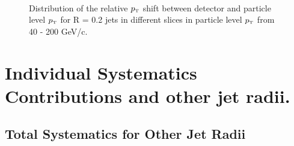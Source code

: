 \documentclass[ALICE]{ALICE_analysis_notes}
\newcommand{\pT}{$p_{\mbox{\tiny T}}$\xspace}
\begin{document}
\begin{appendix}
\begin{figure}[h!]
    \qquad
    \\
    \qquad
    \caption{Distribution of the relative \pT shift between detector and particle level \pT for R = 0.2 jets in different slices in particle level \pT from 40 - 200 GeV/c.}
    \label{fig:EnergyScaleSlices2pPb}
\end{figure}

\newpage

\section{Individual Systematics Contributions and other jet radii.}
\label{sec:AppendixSystematics}

\subsection{Total Systematics for Other Jet Radii}
\label{subsec:appendixTotalSystematics}


\end{appendix}
\end{document}
